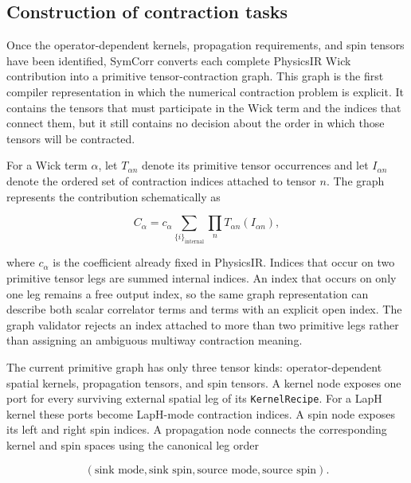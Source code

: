 \documentclass[11pt]{article}
\begin{document}
\subsection{Construction of contraction tasks}

Once the operator-dependent kernels, propagation requirements, and spin tensors
have been identified, SymCorr converts each complete PhysicsIR Wick contribution
into a primitive tensor-contraction graph. This graph is the first compiler
representation in which the numerical contraction problem is explicit. It
contains the tensors that must participate in the Wick term and the indices
that connect them, but it still contains no decision about the order in which
those tensors will be contracted.

For a Wick term \(\alpha\), let \(T_{\alpha n}\) denote its primitive tensor
occurrences and let \(I_{\alpha n}\) denote the ordered set of contraction
indices attached to tensor \(n\). The graph represents the contribution
schematically as

\begin{equation}
C_\alpha
=
c_\alpha
\sum_{\{i\}_{\mathrm{internal}}}
\prod_n
T_{\alpha n}(I_{\alpha n}),
\label{eq:primitive_contraction_task}
\end{equation}

where \(c_\alpha\) is the coefficient already fixed in PhysicsIR. Indices that
occur on two primitive tensor legs are summed internal indices. An index that
occurs on only one leg remains a free output index, so the same graph
representation can describe both scalar correlator terms and terms with an
explicit open index. The graph validator rejects an index attached to more than
two primitive legs rather than assigning an ambiguous multiway contraction
meaning.

The current primitive graph has only three tensor kinds: operator-dependent
spatial kernels, propagation tensors, and spin tensors. A kernel node exposes
one port for every surviving external spatial leg of its
\texttt{KernelRecipe}. For a LapH kernel these ports become LapH-mode
contraction indices. A spin node exposes its left and right spin indices. A
propagation node connects the corresponding kernel and spin spaces using the
canonical leg order

\begin{equation}
(\text{sink mode},\text{sink spin},
 \text{source mode},\text{source spin}).
\label{eq:primitive_propagation_ports}
\end{equation}
\end{document}
